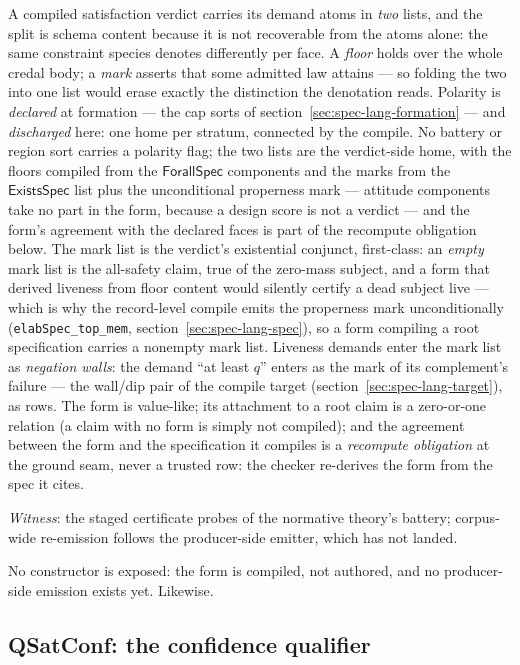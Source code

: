 A compiled satisfaction verdict carries its demand atoms in
\emph{two} lists, and the split is schema content because it is not
recoverable from the atoms alone: the same constraint species denotes
differently per face. A \emph{floor} holds over the whole credal
body; a \emph{mark} asserts that some admitted law attains --- so
folding the two into one list would erase exactly the distinction
the denotation reads. Polarity is \emph{declared} at formation ---
the cap sorts of section~\ref{sec:spec-lang-formation} --- and
\emph{discharged} here: one home per stratum, connected by the
compile. No battery
or region sort carries a polarity flag; the two lists are the
verdict-side home, with the floors compiled from the
$\mathsf{ForallSpec}$ components and the marks from the
$\mathsf{ExistsSpec}$ list plus the unconditional properness mark
--- attitude components take no part in the form, because a design
score is not a verdict ---
and the form's agreement with the declared faces is part of the
recompute obligation below. The mark list is the verdict's existential
conjunct, first-class: an \emph{empty} mark list is the all-safety
claim, true of the zero-mass subject, and a form that derived
liveness from floor content would silently certify a dead subject
live --- which is why the record-level compile emits the properness
mark unconditionally (\texttt{elabSpec\_top\_mem},
section~\ref{sec:spec-lang-spec}), so a form compiling a root
specification carries a nonempty mark list. Liveness demands enter
the mark list as \emph{negation walls}: the demand ``at least $q$''
enters as the mark of its complement's failure --- the wall/dip pair of
the compile target (section~\ref{sec:spec-lang-target}), as rows.
The form is value-like; its attachment to a root claim is a
zero-or-one relation (a claim with no form is simply not compiled);
and the agreement between the form and the specification it
compiles is a \emph{recompute obligation} at the ground seam, never
a trusted row: the checker re-derives the form from the spec it
cites.

\emph{Witness}: the staged certificate probes of the normative
theory's battery; corpus-wide re-emission follows the producer-side
emitter, which has not landed.

No constructor is exposed: the form is compiled, not authored, and
no producer-side emission exists yet.
Likewise.

\subsection{QSatConf: the confidence qualifier}
\label{sec:spec-lang-qsatconf}

